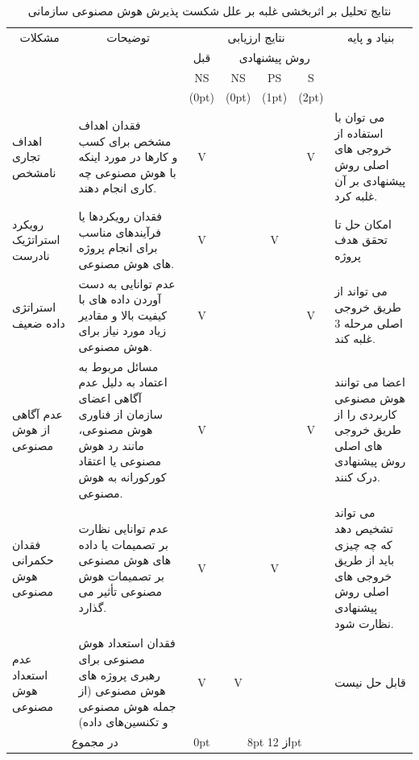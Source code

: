 \documentclass[a4paper,10pt]{article}
\begin{document}
    \begin{table}
                        
        \centering
        \caption{نتایج تحلیل بر اثربخشی غلبه بر علل شکست پذیرش هوش مصنوعی سازمانی}
        \begin{tabularx}{\textwidth}{ p{1.5cm} p{6.5cm} c c c c p{5.5cm} }

            \hline

            \multicolumn{1}{c}{مشکلات} & \multicolumn{1}{c}{توضیحات} & \multicolumn{4}{c}{نتایج ارزیابی} & \multicolumn{1}{c}{بنیاد و پایه} \\
            &  & قبل & \multicolumn{3}{c}{روش پیشنهادی} &  \\
            &  & NS & NS & PS & S &  \\
            &  & (0pt) & (0pt) & (1pt) & (2pt) &  \\

            \hline

            اهداف تجاری نامشخص & فقدان اهداف مشخص برای کسب و کارها در مورد اینکه با هوش مصنوعی چه کاری انجام دهند. & V &  &  & V & می توان با استفاده از خروجی های اصلی روش پیشنهادی بر آن غلبه کرد. \\

            رویکرد استراتژیک نادرست & فقدان رویکردها یا فرآیندهای مناسب برای انجام پروژه های هوش مصنوعی. & V &  & V &  & امکان حل تا تحقق هدف پروژه \\

            استراتژی داده ضعیف & عدم توانایی به دست آوردن داده های با کیفیت بالا و مقادیر زیاد مورد نیاز برای هوش مصنوعی. & V &  &  & V & می تواند از طریق خروجی اصلی مرحله 3 غلبه کند. \\

            عدم آگاهی از هوش مصنوعی & مسائل مربوط به اعتماد به دلیل عدم آگاهی اعضای سازمان از فناوری هوش مصنوعی، مانند رد هوش مصنوعی یا اعتقاد کورکورانه به هوش مصنوعی. & V &  &  & V & اعضا می توانند هوش مصنوعی کاربردی را از طریق خروجی های اصلی روش پیشنهادی درک کنند. \\

            فقدان حکمرانی هوش مصنوعی & عدم توانایی نظارت بر تصمیمات یا داده های هوش مصنوعی بر تصمیمات هوش مصنوعی تأثیر می گذارد. & V &  & V &  & می تواند تشخیص دهد که چه چیزی باید از طریق خروجی های اصلی روش پیشنهادی نظارت شود. \\

            عدم استعداد هوش مصنوعی & فقدان استعداد هوش مصنوعی برای رهبری پروژه های هوش مصنوعی (از جمله هوش مصنوعی و تکنسین‌های داده) & V & V &  &  & قابل حل نیست \\

            \hline

            \multicolumn{2}{c}{در مجموع} & 0pt & \multicolumn{3}{c}{8pt از 12pt} \\

            \hline

        \end{tabularx}

    \end{table}
\end{document}
